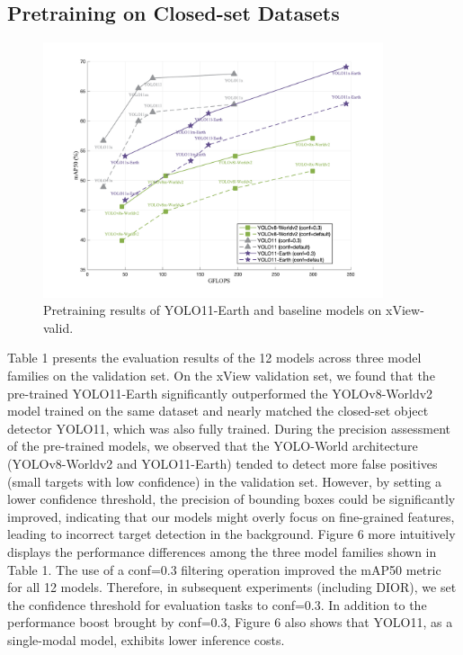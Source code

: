\documentclass{article}
\begin{document}
\subsection{Pretraining on Closed-set Datasets}
\begin{figure}[htbp]
    \centering
    \includegraphics[width=10cm]{../image/6.png}
    \caption{Pretraining results of YOLO11-Earth and baseline models on xView-valid.}
\end{figure}
Table 1 presents the evaluation results of the 12 models across three model families on the validation set. 
On the xView validation set, we found that the pre-trained YOLO11-Earth significantly outperformed the 
YOLOv8-Worldv2 model trained on the same dataset and nearly matched the closed-set object detector YOLO11, 
which was also fully trained. During the precision assessment of the pre-trained models, 
we observed that the YOLO-World architecture (YOLOv8-Worldv2 and YOLO11-Earth) tended to detect more false 
positives (small targets with low confidence) in the validation set. However, by setting a lower confidence 
threshold, the precision of bounding boxes could be significantly improved, indicating that our models might 
overly focus on fine-grained features, leading to incorrect target detection in the background. Figure 6 more 
intuitively displays the performance differences among the three model families shown in Table 1. The use of a 
conf=0.3 filtering operation improved the mAP50 metric for all 12 models. Therefore, in subsequent experiments 
(including DIOR), we set the confidence threshold for evaluation tasks to conf=0.3. In addition to the performance 
boost brought by conf=0.3, Figure 6 also shows that YOLO11, as a single-modal model, exhibits lower inference costs.
\end{document}
